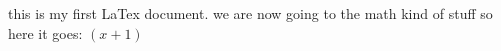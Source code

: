 \documentclass [11pt] {article}
\begin{document}
this is my first LaTex document.
we are now going to the math kind of stuff so here
it goes: $(x+1)$
\end{document}
